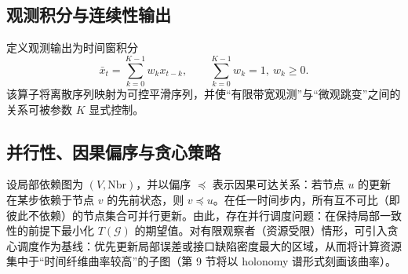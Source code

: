 \subsection{观测积分与连续性输出}

定义观测输出为时间窗积分
$$
\bar x_t=\sum_{k=0}^{K-1}w_k x_{t-k},\qquad \sum_{k=0}^{K-1}w_k=1,\ w_k\ge 0.
$$
该算子将离散序列映射为可控平滑序列，并使“有限带宽观测”与“微观跳变”之间的关系可被参数 $K$ 显式控制。

\subsection{并行性、因果偏序与贪心策略}

设局部依赖图为 $(V,\mathrm{Nbr})$，并以偏序 $\preceq$ 表示因果可达关系：若节点 $u$ 的更新在某步依赖于节点 $v$ 的先前状态，则 $v\preceq u$。在任一时间步内，所有互不可比（即彼此不依赖）的节点集合可并行更新。由此，存在并行调度问题：在保持局部一致性的前提下最小化 $T(\mathcal G)$ 的期望值。对有限观察者（资源受限）情形，可引入贪心调度作为基线：优先更新局部误差或接口缺陷密度最大的区域，从而将计算资源集中于“时间纤维曲率较高”的子图（第 9 节将以 holonomy 谱形式刻画该曲率）。
